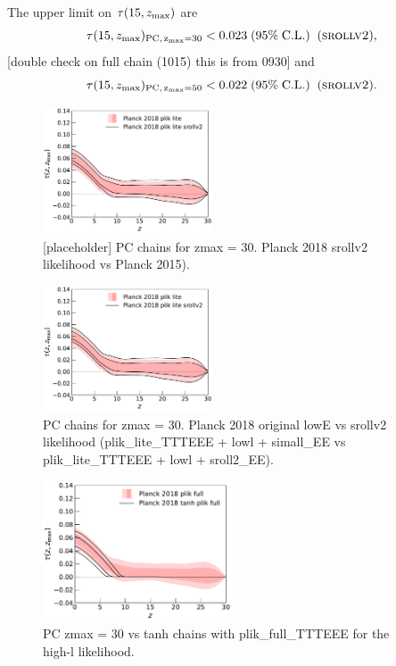 \documentclass[prd,twocolumn,amsmath,amssymb,floatfix,superscriptaddress,nofootinbib]{revtex4-1}
\newcommand{\zmax}{z_{\rm max}}
\newcommand{\beq}{\begin{equation}}
\newcommand{\eeq}{\end{equation}}
\begin{document}
The upper limit on $\tau(15, \zmax)$ are 
\beq
\tau(15, \zmax)_{\rm PC,\, \zmax=30} < 0.023 \; (95\%\; \mathrm{C.L.})\;\;(\textsc{srollv2}),
\eeq
[double check on full chain (1015) this is from 0930]
and 
\beq
\tau(15, \zmax)_{\rm PC,\, \zmax=50} < 0.022 \; (95\%\; \mathrm{C.L.})\;\;(\textsc{srollv2}).
\eeq

\begin{figure}[ht]
\includegraphics[width=0.45\textwidth]{results/direct_mcmc/pl18_plots_zmax30/plot_pub_tau_gtz_dz_0p1_pl18_pc_zmax30_pliklite_post_0930_and_pl18_pc_zmax30_pliklite_srollv2_0930.pdf}
\caption{[placeholder] PC chains for zmax = 30. Planck 2018 srollv2 likelihood vs Planck 2015).
}
\label{fig:plot_taugtz_2015_vs_2018}
\end{figure}

\begin{figure}[ht]
\includegraphics[width=0.45\textwidth]{results/direct_mcmc/pl18_plots_zmax30/plot_pub_tau_gtz_dz_0p1_pl18_pc_zmax30_pliklite_post_0930_and_pl18_pc_zmax30_pliklite_srollv2_0930.pdf}
\caption{PC chains for zmax = 30. Planck 2018 original lowE vs srollv2 likelihood (plik\_lite\_TTTEEE + lowl + simall\_EE vs plik\_lite\_TTTEEE + lowl + sroll2\_EE).
}
\label{fig:plot_taugtz_lowE_vs_srollv2}
\end{figure}


\begin{figure}[ht]
\includegraphics[width=0.5\textwidth]{results/direct_mcmc/pl18_plots_zmax30/plot_pub_tau_gtz_dz_0p1_pl18_pc_zmax30_plikfull_and_pl18_tanh_post_plikfull.pdf}
\caption{PC zmax = 30 vs tanh chains with plik\_full\_TTTEEE for the high-l likelihood.
}
\label{fig:plot_taugtz_PC_vs_tanh}
\end{figure}
\end{document}
